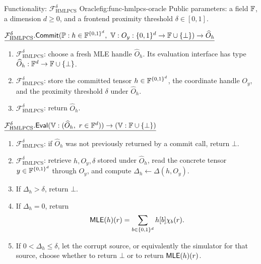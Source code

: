 \begin{protocolbox}{Functionality: \(\mathcal F_{\mathrm{HMLPCS}}^\delta\) Oracle}{fig:func-hmlpcs-oracle}
\noindent Public parameters: a field \(\mathbb{F}\), a dimension \(d\ge 0\), and a
frontend proximity threshold \(\delta\in[0,1]\).

\smallskip
\noindent\(\underline{\mathcal F_{\mathrm{HMLPCS}}^\delta.\mathsf{Commit}(\prover:h\in\F^{\B^d},\ \verifier:O_y:\B^d\to\F\cup\{\bot\})\to \widehat O_h}\)

\smallskip
\begin{enumerate}[leftmargin=0.24in,label=\textbf{H\arabic*.},itemsep=0.08em,topsep=0.1em,parsep=0pt]
  \item \(\mathcal F_{\mathrm{HMLPCS}}^\delta\): choose a fresh MLE handle
        \(\widehat O_h\).  Its evaluation interface has type
        \(\widehat O_h:\mathbb{F}^d\to\mathbb{F}\cup\{\bot\}\).
  \item \(\mathcal F_{\mathrm{HMLPCS}}^\delta\): store the committed tensor
        \(h\in\mathbb{F}^{\{0,1\}^d}\), the coordinate handle \(O_y\), and the proximity
        threshold \(\delta\) under \(\widehat O_h\).
  \item \(\mathcal F_{\mathrm{HMLPCS}}^\delta\): return \(\widehat O_h\).
\end{enumerate}

\smallskip
\noindent\(\underline{\mathcal F_{\mathrm{HMLPCS}}^\delta.\mathsf{Eval}(\verifier:(\widehat O_h,\ r\in\F^d))\to(\verifier:\F\cup\{\bot\})}\)

\smallskip
\begin{enumerate}[leftmargin=0.24in,label=\textbf{E\arabic*.},itemsep=0.08em,topsep=0.1em,parsep=0pt]
  \item \(\mathcal F_{\mathrm{HMLPCS}}^\delta\): if \(\widehat O_h\) was not
        previously returned by a commit call, return \(\bot\).
  \item \(\mathcal F_{\mathrm{HMLPCS}}^\delta\): retrieve
        \(h,O_y,\delta\) stored under \(\widehat O_h\), read the concrete tensor
        \(y\in\mathbb{F}^{\{0,1\}^d}\) through \(O_y\), and compute
        \(\Delta_h\gets\Delta(h,O_y)\).
  \item If \(\Delta_h>\delta\), return \(\bot\).
  \item If \(\Delta_h=0\), return
        \[
          \mathsf{MLE}(h)(r)=\sum_{b\in\{0,1\}^d}h[b]\chi_b(r).
        \]
  \item If \(0<\Delta_h\le\delta\), let the corrupt source, or equivalently
        the simulator for that source, choose whether to return \(\bot\) or to
        return \(\mathsf{MLE}(h)(r)\).
\end{enumerate}
\end{protocolbox}

